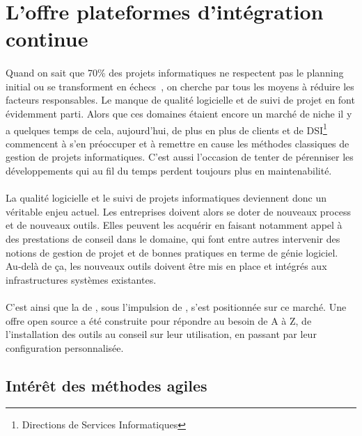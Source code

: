 \section{L'offre \og plateformes d'intégration continue \fg}
\label{section:pic}

\paragraph{}
Quand on sait que 70\% des projets informatiques ne respectent pas le planning initial ou se transforment en échecs~\cite{echec}, on cherche par tous les moyens à réduire les facteurs responsables.
Le manque de qualité logicielle et de suivi de projet en font évidemment parti.
Alors que ces domaines étaient encore un marché de niche il y a quelques temps de cela, aujourd'hui, de plus en plus de clients et de DSI\footnote{Directions de Services Informatiques} commencent à s'en préoccuper et à remettre en cause les méthodes classiques de gestion de projets informatiques.
C'est aussi l'occasion de tenter de pérenniser les développements qui au fil du temps perdent toujours plus en maintenabilité.

\paragraph{}
La qualité logicielle et le suivi de projets informatiques deviennent donc un véritable enjeu actuel.
Les entreprises doivent alors se doter de nouveaux process et de nouveaux outils. 
Elles peuvent les acquérir en faisant notamment appel à des prestations de conseil dans le domaine, qui font entre autres intervenir des notions de gestion de projet et de bonnes pratiques en terme de génie logiciel.
Au-delà de ça, les nouveaux outils doivent être mis en place et intégrés aux infrastructures systèmes existantes.

\paragraph{}
C'est ainsi que la \abusys{} de \asmile, sous l'impulsion de \agulet, s'est positionnée sur ce marché.
Une offre open source a été construite pour répondre au besoin de A à Z, de l'installation des outils au conseil sur leur utilisation, en passant par leur configuration personnalisée.



\subsection{Intérêt des méthodes agiles}



